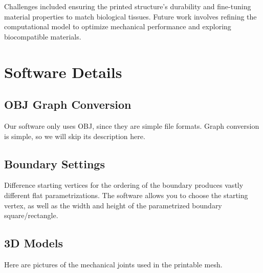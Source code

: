 \documentclass{article}
\begin{document}
Challenges included ensuring the printed structure’s durability and fine-tuning
material properties to match biological tissues. Future work involves refining
the computational model to optimize mechanical performance and exploring
biocompatible materials.

\section{Software Details}

\subsection{OBJ Graph Conversion}
Our software only uses OBJ, since they are simple file formats. Graph conversion is simple, so we will skip its description here.

\subsection{Boundary Settings}
Difference starting vertices for the ordering of the boundary produces vastly different flat parametrizations. The software allows you to choose the starting vertex, as well as the width and height of the parametrized boundary square/rectangle.

\subsection{3D Models}
Here are pictures of the mechanical joints used in the printable mesh.
\end{document}
